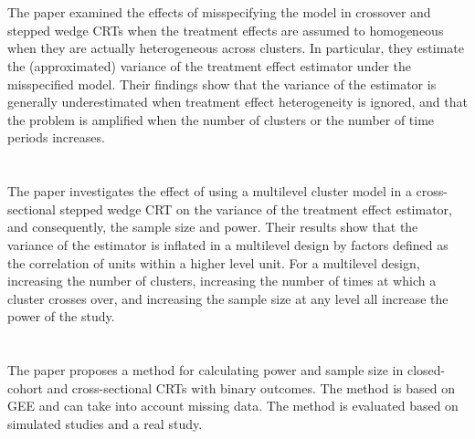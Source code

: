 \documentclass{article}
\begin{document}
\newpage


\section{\textcite{Bowden:2021}}

The paper examined the effects of misspecifying the model in crossover and stepped wedge CRTs when the treatment effects are assumed to homogeneous when they are actually heterogeneous across clusters. In particular, they estimate the (approximated) variance of the treatment effect estimator under the misspecified model. Their findings show that the variance of the estimator is generally underestimated when treatment effect heterogeneity is ignored, and that the problem is amplified when the number of clusters or the number of time periods increases.


\newpage


\section{\textcite{Teerenstra:2019}}

The paper investigates the effect of using a multilevel cluster model in a cross-sectional stepped wedge CRT on the variance of the treatment effect estimator, and consequently, the sample size and power. Their results show that the variance of the estimator is inflated in a multilevel design by factors defined as the correlation of units within a higher level unit. For a multilevel design, increasing the number of clusters, increasing the number of times at which a cluster crosses over, and increasing the sample size at any level all increase the power of the study.


\newpage


\section{\textcite{Wang:2021}}

The paper proposes a method for calculating power and sample size in closed-cohort and cross-sectional CRTs with binary outcomes. The method is based on GEE and can take into account missing data. The method is evaluated based on simulated studies and a real study.


\newpage


\printbibliography
\end{document}
